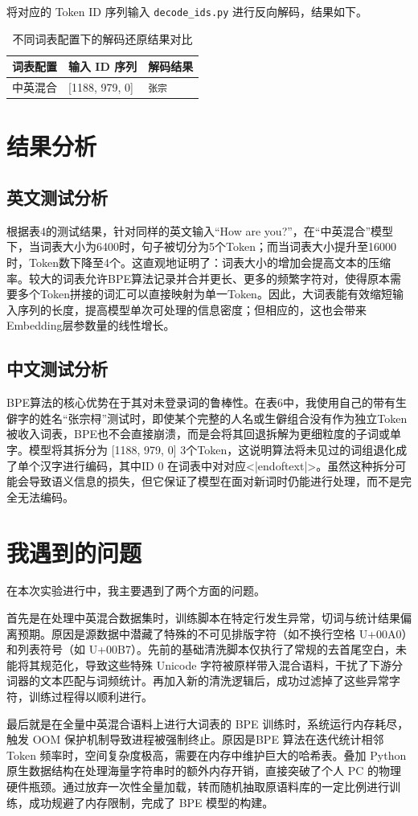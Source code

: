 \documentclass[a4paper,12pt]{ctexart} %
\begin{document}
将对应的 Token ID 序列输入 \texttt{decode\_ids.py} 进行反向解码，结果如下。

\begin{table}[H]
    \centering
    \begin{tabular}{p{} p{} p{}}
        \toprule
        词表配置 & 输入 ID 序列 & 解码结果 \\
        \midrule
        中英混合 & [1188, 979, 0] & \texttt{张宗 } \\
        \bottomrule
    \end{tabular}
    \caption{不同词表配置下的解码还原结果对比}
\end{table}



\section{结果分析}
\subsection{英文测试分析}
根据表4的测试结果，针对同样的英文输入“How are you?”，在“中英混合”模型下，当词表大小为6400时，句子被切分为5个Token；而当词表大小提升至16000时，Token数下降至4个。这直观地证明了：词表大小的增加会提高文本的压缩率。较大的词表允许BPE算法记录并合并更长、更多的频繁字符对，使得原本需要多个Token拼接的词汇可以直接映射为单一Token。因此，大词表能有效缩短输入序列的长度，提高模型单次可处理的信息密度；但相应的，这也会带来Embedding层参数量的线性增长。

\subsection{中文测试分析}
BPE算法的核心优势在于其对未登录词的鲁棒性。在表6中，我使用自己的带有生僻字的姓名“张宗桪”测试时，即使某个完整的人名或生僻组合没有作为独立Token被收入词表，BPE也不会直接崩溃，而是会将其回退拆解为更细粒度的子词或单字。模型将其拆分为 [1188, 979, 0] 3个Token，这说明算法将未见过的词组退化成了单个汉字进行编码，其中ID 0 在词表中对对应<|endoftext|>。虽然这种拆分可能会导致语义信息的损失，但它保证了模型在面对新词时仍能进行处理，而不是完全无法编码。

\section{我遇到的问题}
在本次实验进行中，我主要遇到了两个方面的问题。

首先是在处理中英混合数据集时，训练脚本在特定行发生异常，切词与统计结果偏离预期。原因是源数据中潜藏了特殊的不可见排版字符（如不换行空格 U+00A0）和列表符号（如 U+00B7）。先前的基础清洗脚本仅执行了常规的去首尾空白，未能将其规范化，导致这些特殊 Unicode 字符被原样带入混合语料，干扰了下游分词器的文本匹配与词频统计。再加入新的清洗逻辑后，成功过滤掉了这些异常字符，训练过程得以顺利进行。

最后就是在全量中英混合语料上进行大词表的 BPE 训练时，系统运行内存耗尽，触发 OOM 保护机制导致进程被强制终止。原因是BPE 算法在迭代统计相邻 Token 频率时，空间复杂度极高，需要在内存中维护巨大的哈希表。叠加 Python 原生数据结构在处理海量字符串时的额外内存开销，直接突破了个人 PC 的物理硬件瓶颈。通过放弃一次性全量加载，转而随机抽取原语料库的一定比例进行训练，成功规避了内存限制，完成了 BPE 模型的构建。
\end{document}
